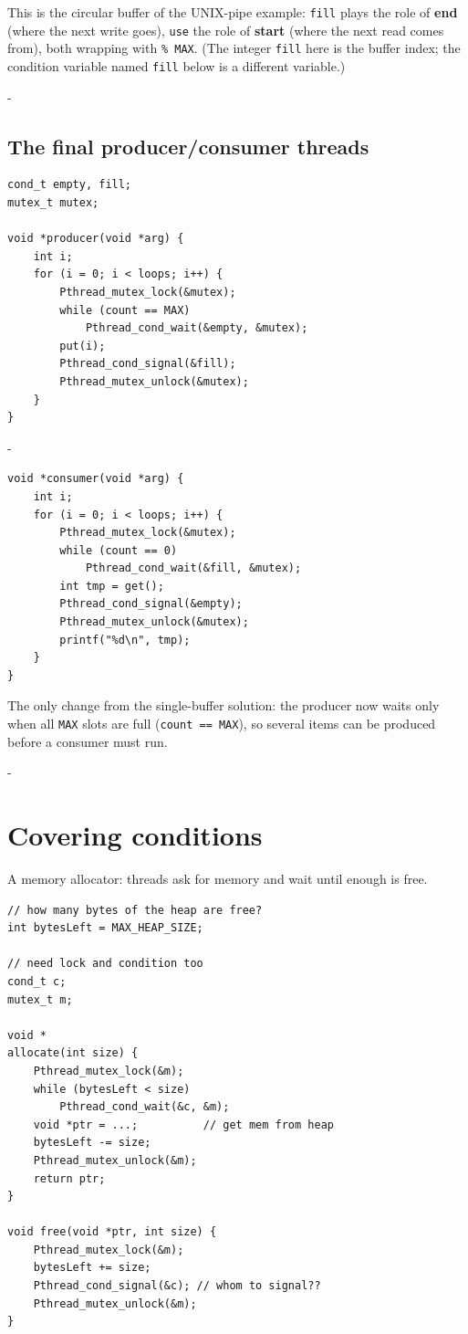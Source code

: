 \documentclass[11pt,a4paper]{article}
\makeatletter
\newcommand{\keepspace}[1]{\par\penalty-100\begingroup
  \setlength{\dimen@}{#1}\dimen@ii\pagegoal\advance\dimen@ii-\pagetotal
  \ifdim\dimen@>\dimen@ii\ifdim\dimen@ii>\z@\vfil\fi\break\fi\endgroup}
\makeatother
\begin{document}
This is the circular buffer of the UNIX-pipe example: \texttt{fill} plays
the role of \textbf{end} (where the next write goes), \texttt{use} the role
of \textbf{start} (where the next read comes from), both wrapping with
\texttt{\% MAX}. (The integer \texttt{fill} here is the buffer index; the
condition variable named \texttt{fill} below is a different variable.)

\keepspace{18\baselineskip}
\subsection{The final producer/consumer threads}

\begin{lstlisting}
cond_t empty, fill;
mutex_t mutex;

void *producer(void *arg) {
    int i;
    for (i = 0; i < loops; i++) {
        Pthread_mutex_lock(&mutex);
        while (count == MAX)
            Pthread_cond_wait(&empty, &mutex);
        put(i);
        Pthread_cond_signal(&fill);
        Pthread_mutex_unlock(&mutex);
    }
}
\end{lstlisting}

\keepspace{14\baselineskip}
\begin{lstlisting}[firstnumber=16]
void *consumer(void *arg) {
    int i;
    for (i = 0; i < loops; i++) {
        Pthread_mutex_lock(&mutex);
        while (count == 0)
            Pthread_cond_wait(&fill, &mutex);
        int tmp = get();
        Pthread_cond_signal(&empty);
        Pthread_mutex_unlock(&mutex);
        printf("%d\n", tmp);
    }
}
\end{lstlisting}

The only change from the single-buffer solution: the producer now waits
only when all \texttt{MAX} slots are full (\texttt{count == MAX}), so several
items can be produced before a consumer must run.

\keepspace{32\baselineskip}
\section{Covering conditions}

A memory allocator: threads ask for memory and wait until enough is free.

\begin{lstlisting}
// how many bytes of the heap are free?
int bytesLeft = MAX_HEAP_SIZE;

// need lock and condition too
cond_t c;
mutex_t m;

void *
allocate(int size) {
    Pthread_mutex_lock(&m);
    while (bytesLeft < size)
        Pthread_cond_wait(&c, &m);
    void *ptr = ...;          // get mem from heap
    bytesLeft -= size;
    Pthread_mutex_unlock(&m);
    return ptr;
}

void free(void *ptr, int size) {
    Pthread_mutex_lock(&m);
    bytesLeft += size;
    Pthread_cond_signal(&c); // whom to signal??
    Pthread_mutex_unlock(&m);
}
\end{lstlisting}
\end{document}
